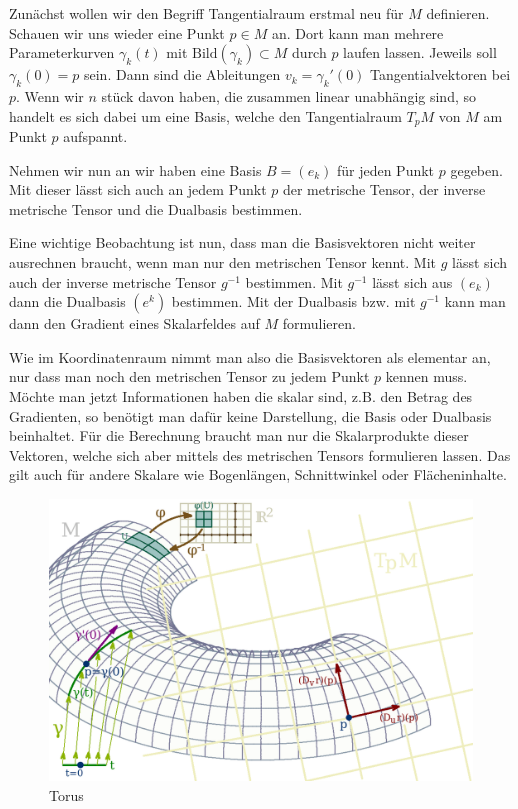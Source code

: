 \documentclass[a4paper,12pt,fleqn]{article}
\begin{document}
Zunächst wollen wir den Begriff Tangentialraum erstmal neu für
\(M\) definieren. Schauen wir uns wieder eine Punkt \(p\in M\)
an. Dort kann man mehrere Parameterkurven \(\gamma_k(t)\) mit
\(\mathrm{Bild}(\gamma_k)\subset M\)
durch \(p\) laufen lassen. Jeweils soll \(\gamma_k(0)=p\) sein.
Dann sind die Ableitungen \(v_k=\gamma_k'(0)\) Tangentialvektoren
bei \(p\). Wenn wir \(n\) stück davon haben, die zusammen linear
unabhängig sind, so handelt es sich dabei um eine Basis, welche
den Tangentialraum \(T_p M\) von \(M\) am Punkt \(p\) aufspannt.

Nehmen wir nun an wir haben eine Basis \(B=(e_k)\) für
jeden Punkt \(p\) gegeben. Mit dieser lässt sich auch an jedem
Punkt \(p\) der metrische Tensor, der inverse metrische Tensor
und die Dualbasis bestimmen.

Eine wichtige Beobachtung ist nun, dass man die Basisvektoren
nicht weiter ausrechnen braucht, wenn man nur den metrischen
Tensor kennt. Mit \(g\) lässt sich auch der inverse metrische
Tensor \(g^{-1}\) bestimmen. Mit \(g^{-1}\) lässt sich aus \((e_k)\)
dann die Dualbasis \((e^k)\) bestimmen. Mit der Dualbasis bzw.
mit \(g^{-1}\) kann man dann den Gradient eines Skalarfeldes
auf \(M\) formulieren.

Wie im Koordinatenraum nimmt man also die Basisvektoren als
elementar an, nur dass man noch den metrischen Tensor zu
jedem Punkt \(p\) kennen muss. Möchte man jetzt Informationen
haben die skalar sind, z.B. den Betrag des Gradienten, so benötigt
man dafür keine Darstellung, die Basis oder Dualbasis beinhaltet.
Für die Berechnung braucht man nur die Skalarprodukte dieser
Vektoren, welche sich aber mittels des metrischen Tensors formulieren
lassen. Das gilt auch für andere Skalare wie Bogenlängen,
Schnittwinkel oder Flächeninhalte.

\begin{figure}[h]
\centering
\includegraphics[width=140mm]{img/Torus.png}
\caption{Torus}
\label{img:Torus}
\end{figure}
\end{document}
